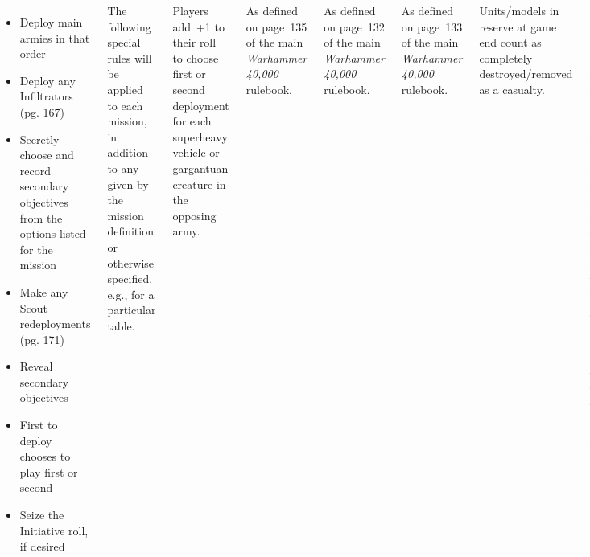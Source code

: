 \documentclass{40k}
\begin{document}
\begin{columns}
\begin{itemize}
\item Deploy main armies in that order

\item Deploy any Infiltrators (pg. 167)

\item Secretly choose and record secondary objectives from the options
  listed for the mission

\item Make any Scout redeployments (pg. 171)

\item Reveal secondary objectives

\item First to deploy chooses to play first or second

\item Seize the Initiative roll, if desired

\end{itemize}

\columnbreak

%

The following special rules will be applied to each mission, in
addition to any given by the mission definition or otherwise
specified, e.g., for a particular table.

  Players add~+1 to their roll to
choose first or second deployment for each superheavy vehicle or
gargantuan creature in the opposing army.

 As defined on page~135 of the main
\emph{Warhammer 40,000} rulebook.

 As defined on page~132 of
the main \emph{Warhammer 40,000} rulebook.

 As defined on page~133 of
the main \emph{Warhammer 40,000} rulebook.

  Units/models in reserve at game end count
as completely destroyed/removed as a casualty.

%

Match results are determined by scoring primary, secondary, and
tertiary objectives as given for each mission.  Any unit or faction
specific rules granting victory points \emph{to a player's opponent}
also apply.  The winner is the player with more victory points.

Tournament standings are determined by win/draw/loss records and then
the sum total victory points earned across all three missions.  No
more than~20 victory points may be earned per mission toward these
standings, though any additional victory points do count toward
determining match results.


\end{columns}
\end{document}
